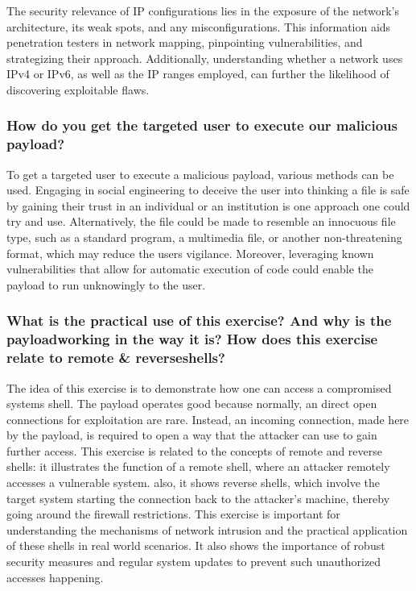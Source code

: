 The security relevance of IP configurations lies in the exposure of the network's architecture, its weak spots, and any misconfigurations.
This information aids penetration testers in network mapping, pinpointing vulnerabilities, and strategizing their approach.
Additionally, understanding whether a network uses IPv4 or IPv6, as well as the IP ranges employed, can further the likelihood of discovering exploitable flaws.



\subsubsection{How do you get the targeted user to execute our malicious payload?}
To get a targeted user to execute a malicious payload, various methods can be used.
Engaging in social engineering to deceive the user into thinking a file is safe by gaining their trust in an individual or an institution is one approach one could try and use.
Alternatively, the file could be made to resemble an innocuous file type, such as a standard program, a multimedia file, or another non-threatening format,
which may reduce the users vigilance. Moreover, leveraging known vulnerabilities that allow for automatic execution of code could enable the payload to run unknowingly to the user.





\subsubsection{What is the practical use of this exercise? And why is the payloadworking in the way it is? How does this exercise relate to remote \& reverseshells?}
The idea of this exercise is to demonstrate how one can access a compromised systems shell.
The payload operates good because normally, an direct open connections for exploitation are rare.
Instead, an incoming connection, made here by the payload, is required to open a way that the attacker can use to gain further access.
This exercise is related to the concepts of remote and reverse shells: it illustrates the function of a remote shell, where an attacker remotely accesses a vulnerable system.
also, it shows reverse shells, which involve the target system starting the connection back to the attacker's machine,
thereby going around the firewall restrictions. This exercise is important for understanding the mechanisms of network intrusion and the practical application of these
shells in real world scenarios. It also shows the importance of robust security measures and regular system updates to prevent such unauthorized accesses happening.


